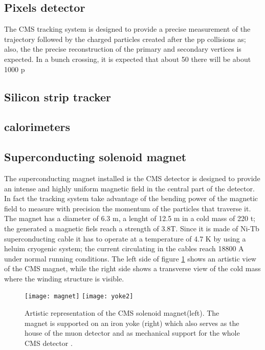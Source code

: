 \subsection{Pixels detector}

\noindent  The CMS tracking system is designed to provide a precise measurement of the trajectory followed by the charged particles created after the pp collisions as; also, the the precise reconstruction of the primary and secondary vertices is expected. In a bunch crossing, it is expected that about 50 there will be about 1000 p




\subsection{Silicon strip tracker}
\subsection{calorimeters}
\subsection{Superconducting solenoid magnet}

\noindent The superconducting magnet installed is the CMS detector is designed to provide an intense and highly uniform magnetic field in the central part of the detector. In fact the tracking system take advantage of the bending power of the magnetic field to measure with precision the momentum of the particles that traverse it. The magnet has a diameter of 6.3 m, a lenght of 12.5 m in a cold mass of 220 t; the generated a magnetic fiels reach a strength of 3.8T. Since it is made of Ni-Tb superconducting cable it has to operate at a temperature of 4.7 K by using a heluim cryogenic system; the current circulating in the cables reach 18800 A under normal running conditions. The left side of figure \ref{fig:yoke} shows an artistic view of the CMS magnet, while the right side shows a transverse view of the cold mass where the winding structure is visible. \\
\begin{figure}[h!]
  \centering
  \texttt{[image: magnet]}
  \texttt{[image: yoke2]}
  \caption[CMS solenoid magnet]{Artistic representation of the CMS solenoid magnet(left). The magnet is supported on an iron yoke (right) which also serves as the house of the muon detector and as mechanical support for the whole CMS detector \cite{yoke2}.}
  \label{fig:yoke}
\end{figure}

